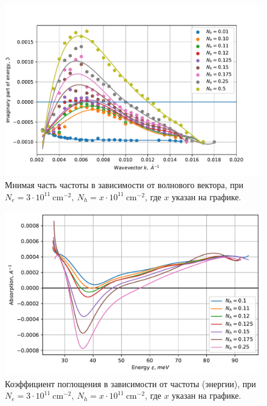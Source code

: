 \documentclass[../main.tex]{subfiles}
\begin{document}
    \begin{figure}[h]
        \begin{minipage}[h]{\textwidth}
            \includegraphics[width=1\textwidth]{./images/plazmon6nm3neXnpim.pdf}
            \caption{Мнимая часть частоты в зависимости от волнового вектора, при 
            $N_e = 3 \cdot 10^{11}~\text{cm}^{-2},~N_h = x \cdot 10^{11}~\text{cm}^{-2}$,
            где $x$ указан на графике.\label{plasmon:6nm3neXnpim}}
        \end{minipage}
    \end{figure}
    \begin{figure}[h]
        \begin{minipage}[h]{\textwidth}
            \includegraphics[width=1\textwidth]{./images/absortion-6nm-ne3.pdf}
            \caption{Коэффициент поглощения в зависимости от частоты (энергии), при 
            $N_e = 3 \cdot 10^{11}~\text{cm}^{-2},~N_h = x \cdot 10^{11}~\text{cm}^{-2}$,
            где $x$ указан на графике.\label{plasmon:6nm3neXnpAbs}}
        \end{minipage}
    \end{figure}
\end{document}
